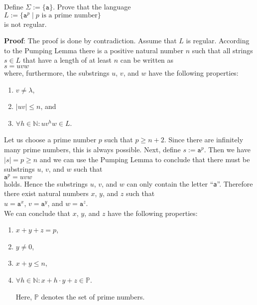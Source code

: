 \exerciseEng
Define $\Sigma := \{\mathtt{a}\}$.  
Prove that the language
\\[0.2cm]
\hspace*{1.3cm}
$L := \bigl\{ \mathtt{a}^p \mid \mbox{$p$ is a prime number} \bigr\}$
\\[0.2cm]
is not regular.  \eox
\vspace{0.3cm}

\noindent
\textbf{Proof}:
The proof is done by contradiction.  Assume that $L$ is regular.  According to the Pumping Lemma there is a
positive natural number $n$ such that all strings $s \in L$ that have a length of at least $n$ can be written as
\\[0.2cm]
\hspace*{1.3cm}
$s = uvw$
\\[0.2cm]
where, furthermore, the substrings $u$, $v$, and $w$ have the following properties:
\begin{enumerate}
\item $v \not= \lambda$, 
\item $|uv| \leq n$, \quad and
\item $\forall h \in \mathbb{N}: u v^h w \in L$.
\end{enumerate}
Let us choose a prime number $p$ such that $p \geq n + 2$.
Since there are infinitely many prime numbers, this
is always possible.  Next,  define $s := \mathtt{a}^p$.
Then we have $|s| = p \geq n$ and we can use the Pumping Lemma to conclude that there must be substrings $u$,
$v$, and $w$ such that
\\[0.2cm]
\hspace*{1.3cm}
$\mathtt{a}^p = uvw$ 
\\[0.2cm]
holds.
Hence the substrings $u$, $v$, and $w$ can only contain the letter ``\texttt{a}''.  Therefore there exist
natural numbers $x$, $y$, and $z$ such that
\\[0.2cm]
\hspace*{1.3cm}
$u = \mathtt{a}^x$, \quad $v = \mathtt{a}^y$, \quad and \quad $w = \mathtt{a}^z$.
\\[0.2cm]
We can conclude that  $x$, $y$, and $z$ have the following properties:
\begin{enumerate}
\item $x + y + z = p$,
\item $y \not= 0$,
\item $x + y \leq n$,
\item $\forall h \in \mathbb{N}: x + h \cdot y + z \in \mathbb{P}$.

      Here, $\mathbb{P}$ denotes the set of prime numbers.
\end{enumerate}
